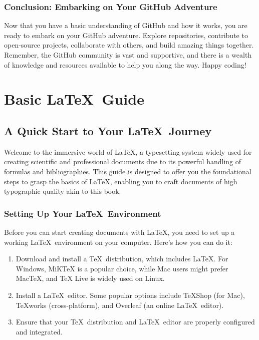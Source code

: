\documentclass[a4paper,12pt]{book}
\begin{document}
\subsection*{Conclusion: Embarking on Your GitHub Adventure}

Now that you have a basic understanding of GitHub and how it works, you are ready to embark on your GitHub adventure. Explore repositories, contribute to open-source projects, collaborate with others, and build amazing things together. Remember, the GitHub community is vast and supportive, and there is a wealth of knowledge and resources available to help you along the way. Happy coding!

\chapter{Basic \LaTeX\ Guide}
\section*{A Quick Start to Your \LaTeX\ Journey}

Welcome to the immersive world of \LaTeX, a typesetting system widely used for creating scientific and professional documents due to its powerful handling of formulas and bibliographies. This guide is designed to offer you the foundational steps to grasp the basics of \LaTeX, enabling you to craft documents of high typographic quality akin to this book.

\subsection*{Setting Up Your \LaTeX\ Environment}

Before you can start creating documents with \LaTeX, you need to set up a working \LaTeX\ environment on your computer. Here's how you can do it:

\begin{enumerate}
    \item Download and install a \TeX\ distribution, which includes \LaTeX. For Windows, MiKTeX is a popular choice, while Mac users might prefer MacTeX, and TeX Live is widely used on Linux.
    \item Install a \LaTeX\ editor. Some popular options include TeXShop (for Mac), TeXworks (cross-platform), and Overleaf (an online \LaTeX\ editor).
    \item Ensure that your \TeX\ distribution and \LaTeX\ editor are properly configured and integrated.
\end{enumerate}
\end{document}
